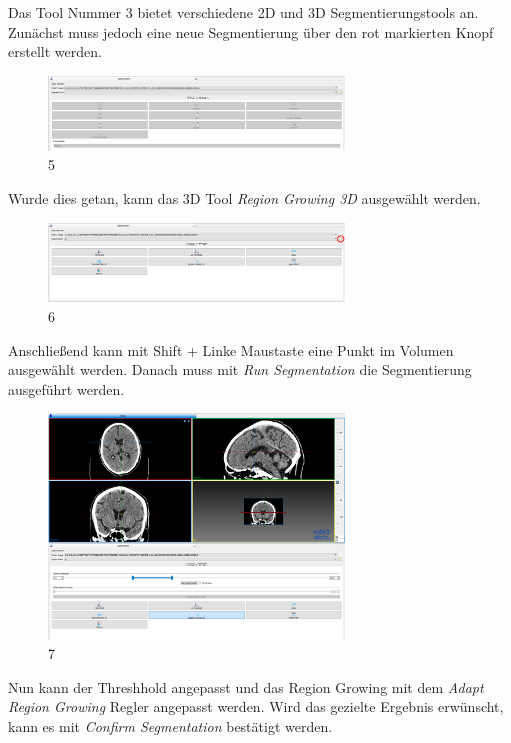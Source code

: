 Das Tool Nummer 3  bietet verschiedene 2D und 3D Segmentierungstools an. Zunächst muss jedoch eine neue Segmentierung über den rot markierten Knopf erstellt werden.

\begin{figure}[H]
\centering 
\includegraphics[width=0.7\textwidth]{Logos/MITK_Doku/5.PNG}
\caption{5} 
\label{fig:fuenf} 
\end{figure}

Wurde dies getan, kann das 3D Tool \textit{Region Growing 3D} ausgewählt werden.

\begin{figure}[H] 
\centering 
\includegraphics[width=0.7\textwidth]{Logos/MITK_Doku/6.PNG}
\caption{6} 
\label{fig:sechs} 
\end{figure}

Anschließend kann mit Shift + Linke Maustaste eine Punkt im Volumen ausgewählt werden. Danach muss mit  \textit{Run Segmentation} die Segmentierung ausgeführt werden.

\begin{figure}[H] 
\centering 
\includegraphics[width=0.7\textwidth]{Logos/MITK_Doku/7.PNG}
\caption{7} 
\label{fig:sieben} 
\end{figure}

Nun kann der Threshhold angepasst und das Region Growing mit dem \textit{Adapt Region Growing} Regler angepasst werden. Wird das gezielte Ergebnis erwünscht, kann es mit \textit{Confirm Segmentation} bestätigt werden.

